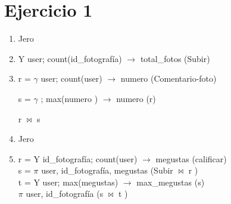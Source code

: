 \documentclass[a4paper, 12pt]{report}
\begin{document}
\section*{Ejercicio 1}{
\begin{enumerate}[label=\alph*)]
\item{Jero}
\item{ Y user; count(id\_fotografía) $\rightarrow$ total\_fotos (Subir)\\
}
\item{r = $\gamma$ user; count(user) $\rightarrow$ numero (Comentario-foto)

s = $\gamma$ ; max(numero ) $\rightarrow$ numero (r)

r $\Join$ s}
\item{Jero}
\item{r = Y id\_fotografía; count(user) $\rightarrow$ megustas (calificar)\\
s = $\pi$ user, id\_fotografía, megustas (Subir $\Join$ r )\\
t = Y user; max(megustas) $\rightarrow$ max\_megustas (s)\\
$\pi$ user, id\_fotografía (s $\Join$ t )}
\end{enumerate}
}
\end{document}
